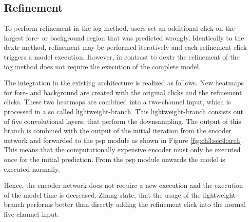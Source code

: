 \subsection{Refinement}\label{ord:ch3:sec4:subsec4}

To perform refinement in the \gls{iog} method, users set an additional click on the largest fore- or background region that was predicted wrongly.
Identically to the \gls{dextr} method, refinement may be performed iteratively and each refinement click triggers a model execution.
However, in contrast to \gls{dextr} the refinement of the \gls{iog} method does not require the execution of the complete model.

The integration in the existing architecture is realized as follows.
New heatmaps for fore- and background are created with the original clicks and the refinement clicks.
These two heatmaps are combined into a two-channel input, which is processed in a so called lightweight-branch.
This lightweight-branch consists out of five convolutional layers, that perform the downsampling.
The output of this branch is combined with the output of the initial iteration from the encoder network and forwarded to the \gls{psp} module as shown in Figure \ref{fig:ch3:sec4:arch}.
This means that the computationally expensive encoder must only be executed once for the initial prediction.
From the \gls{psp} module onwards the model is executed normally.

Hence, the encoder network does not require a new execution and the execution of the model time is decreased.
Zhang \etal state, that the usage of the lightweight-branch performs better than directly adding the refinement click into the normal five-channel input.


